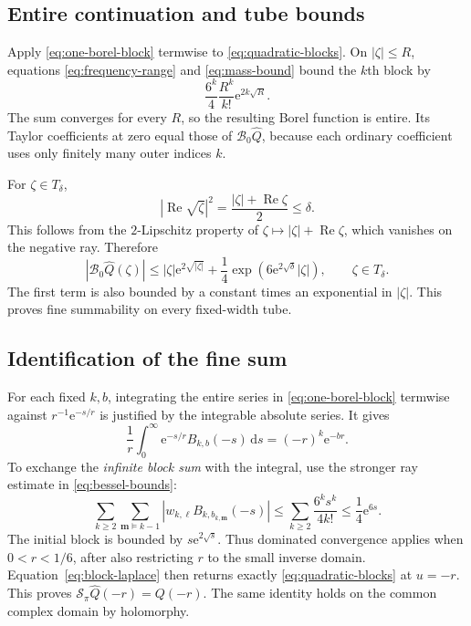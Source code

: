 \documentclass[11pt,a4paper]{article}
\numberwithin{equation}{section}
\theoremstyle{definition}
\theoremstyle{remark}
\newcommand{\ee}{\mathrm e}
\newcommand{\dd}{\mathrm d}
\newcommand{\Ree}{\operatorname{Re}}
\newcommand{\B}{\mathcal B_0}
\newcommand{\Q}{\widehat Q}
\begin{document}
\subsection{Entire continuation and tube bounds}
Apply \eqref{eq:one-borel-block} termwise to
\eqref{eq:quadratic-blocks}.  On $|\zeta|\le R$, equations
\eqref{eq:frequency-range} and \eqref{eq:mass-bound} bound the $k$th
block by
\[
 \frac{6^k}{4}\frac{R^k}{k!}\ee^{2k\sqrt R}.
\]
The sum converges for every $R$, so the resulting Borel function is entire.
Its Taylor coefficients at zero equal those of $\B\Q$, because each
ordinary coefficient uses only finitely many outer indices $k$.

For $\zeta\in T_\delta$,
\begin{equation}
 |\Ree\sqrt\zeta|^2
       =\frac{|\zeta|+\Ree\zeta}{2}\le\delta.
 \label{eq:sqrt-tube}
\end{equation}
This follows from the $2$-Lipschitz property of
$\zeta\mapsto|\zeta|+\Ree\zeta$, which vanishes on the negative ray.
Therefore
\begin{equation}
 |\B\Q(\zeta)|
 \le |\zeta|\ee^{2\sqrt{|\zeta|}}
      +\frac14\exp\left(6\ee^{2\sqrt\delta}|\zeta|\right),
 \qquad \zeta\in T_\delta.
 \label{eq:explicit-tube-bound}
\end{equation}
The first term is also bounded by a constant times an exponential in
$|\zeta|$.  This proves fine summability on every fixed-width tube.

\subsection{Identification of the fine sum}
For each fixed $k,b$, integrating the entire series in
\eqref{eq:one-borel-block} termwise against $r^{-1}\ee^{-s/r}$ is
justified by the integrable absolute series.  It gives
\begin{equation}
 \frac1r\int_0^\infty\ee^{-s/r}B_{k,b}(-s)\,\dd s
       =(-r)^k\ee^{-br}.
 \label{eq:block-laplace}
\end{equation}
To exchange the \emph{infinite block sum} with the integral, use the
stronger ray estimate in \eqref{eq:bessel-bounds}:
\[
 \sum_{k\ge2}\sum_{\mathbf m\vDash k-1}
     |w_{k,\ell}B_{k,b_{k,\mathbf m}}(-s)|
       \le\sum_{k\ge2}\frac{6^ks^k}{4k!}\le\frac14\ee^{6s}.
\]
The initial block is bounded by $s\ee^{2\sqrt s}$.
Thus dominated convergence applies when $0<r<1/6$, after also restricting
$r$ to the small inverse domain.  Equation~\eqref{eq:block-laplace}
then returns exactly \eqref{eq:quadratic-blocks} at $u=-r$.
This proves $\mathcal S_\pi\Q(-r)=Q(-r)$.
The same identity holds on the common complex domain by holomorphy.
\end{document}

